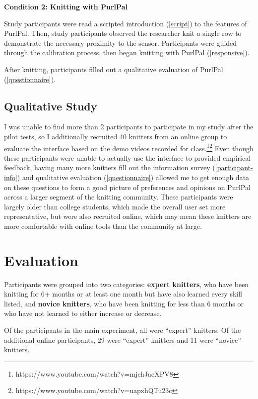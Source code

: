 \documentclass{article}
\begin{document}
\medskip

\textbf{Condition 2: Knitting with PurlPal}

Study participants were read a scripted introduction (\ref{script}) to the features of PurlPal.
Then, study participants observed the researcher knit a single row to demonstrate the necessary proximity to the sensor.
Participants were guided through the calibration process, then began knitting with PurlPal (\ref{responsive}).

\medskip

After knitting, participants filled out a qualitative evaluation of PurlPal (\ref{questionnaire}).

\subsection{Qualitative Study}

I was unable to find more than 2 participants to participate in my study after the pilot tests, so I additionally recruited 40 knitters from an online group to evaluate the interface based on the demo videos recorded for class.\footnote{https://www.youtube.com/watch?v=mjchJaeXPV8}\footnote{https://www.youtube.com/watch?v=uapxhQTu23c}
Even though these participants were unable to actually use the interface to provided empirical feedback, having many more knitters fill out the information survey (\ref{participant-info}) and qualitative evaluation (\ref{questionnaire}) allowed me to get enough data on these questions to form a good picture of preferences and opinions on PurlPal across a larger segment of the knitting community.
These participants were largely older than college students, which made the overall user set more representative, but were also recruited online, which may mean these knitters are more comfortable with online tools than the community at large.

\section{Evaluation}

Participants were grouped into two categories:
\textbf{expert knitters}, who have been knitting for 6+ months or at least one month but have also learned every skill listed,
and \textbf{novice knitters}, who have been knitting for less than 6 months or who have not learned to either increase or decrease.

Of the participants in the main experiment, all were ``expert'' knitters.
Of the additional online participants, 29 were ``expert'' knitters and 11 were ``novice'' knitters.
\end{document}
